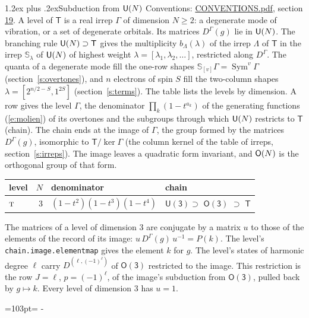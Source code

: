 \documentclass[10pt,a4paper]{article}
\makeatletter
\renewcommand\section{\@startsection{section}{1}{\z@}{-3ex plus -1ex minus -.2ex}%
  {1.2ex plus .2ex}{\normalfont\large\sffamily\bfseries\color{parttitle}}}
\newcommand{\needspace}[1]{\par\penalty-100\begingroup\dimen0=#1\relax\dimen2=\pagegoal
  \advance\dimen2-\pagetotal\ifdim\dimen0>\dimen2\relax\ifdim\dimen2>0pt\vfil\break\fi\fi
  \endgroup}
\numberwithin{equation}{section}
\newcommand{\grp}[1]{\mathsf{#1}}
\newcommand{\irr}[1]{\text{\normalfont\scshape #1}}
\newcommand{\irrJp}[2]{D^{(#1,#2)}}
\newcommand{\repD}[1]{D^{#1}}
\newcommand{\schur}[1]{\mathbb{S}_{#1}}
\newcommand{\shape}[1]{[#1]}
\makeatother
\begin{document}
\section{Subduction from \texorpdfstring{$\grp{U(\mathnormal{N})}$}{U(N)}}\label{s:unitary}
Conventions: \href{../../CONVENTIONS.pdf}{CONVENTIONS.pdf}, section \href{../../CONVENTIONS.pdf\#conv.19}{19}.
\leavevmode\label{n:local.level.dimension}A level of $\grp{T}$ is a real irrep $\Gamma$ of dimension $N \ge 2$: a degenerate mode of vibration, or a set of degenerate orbitals. \label{n:group.unitary}Its matrices $\repD{\Gamma}(g)$ lie in $\grp{U(\mathnormal{N})}$. \label{n:irrep.schur}\label{n:shape.partition}\label{n:local.partition}\label{n:function.multiplicity.unitary}The branching rule $\grp{U(\mathnormal{N})} \supset \grp{T}$ gives the multiplicity $b_\Lambda(\lambda)$ of the irrep $\Lambda$ of $\grp{T}$ in the irrep $\schur{\lambda}$ of $\grp{U(\mathnormal{N})}$ of highest weight $\lambda = \shape{\lambda_1, \lambda_2, \dots}$, restricted along $\repD{\Gamma}$. \label{n:local.partition.power}\label{n:local.electrons}\label{n:local.spin}The quanta of a degenerate mode fill the one-row shapes $\schur{\shape{v}}\Gamma = \operatorname{Sym}^{v}\Gamma$ (section~\ref{s:overtones}), and $n$ electrons of spin $S$ fill the two-column shapes $\lambda = \shape{2^{n/2-S}, 1^{2S}}$ (section~\ref{s:terms}).
The table lists the levels by dimension. \label{n:head.level}\label{n:head.denominator}\label{n:index.overtone.denominator}\label{n:head.chain}A row gives the level $\Gamma$, the denominator $\prod_k (1 - t^{a_k})$ of the generating functions (\ref{e:molien}) of its overtones and the subgroups through which $\grp{U(\mathnormal{N})}$ restricts to $\grp{T}$ (chain). The chain ends at the image of $\Gamma$, the group formed by the matrices $\repD{\Gamma}(g)$, isomorphic to $\grp{T}/\ker\Gamma$ (the column kernel of the table of irreps, section~\ref{s:irreps}). The image leaves a quadratic form invariant, and $\grp{O(\mathnormal{N})}$ is the orthogonal group of that form.
{\small\begin{longtable}{@{}lrll@{}}\toprule
level & $N$ & denominator & chain\\\midrule\endhead
\bottomrule\endfoot\endlastfoot
$\irr{t}$ & 3 & $(1-t^{2})(1-t^{3})(1-t^{4})$ & $\grp{U(3)} \supset$ \href{O3.pdf}{$\grp{O(3)}$} $\supset$ \href{T.pdf}{$\grp{T}$}\\
\bottomrule\end{longtable}}
\leavevmode\label{n:matrix.conjugator}The matrices of a level of dimension 3 are conjugate by a matrix $u$ to those of the elements of the record of its image: $u\,\repD{\Gamma}(g)\,u^{-1} = P(k)$. The level's \texttt{chain.image.elementmap} gives the element $k$ for $g$. \label{n:index.harmonic.degree}The level's states of harmonic degree $\ell$ carry $\irrJp{\ell}{(-1)^{\ell}}$ of \href{O3.pdf}{$\grp{O(3)}$} restricted to the image. This restriction is the row $J = \ell$, $p = (-1)^{\ell}$, of the image's subduction from \href{O3.pdf}{$\grp{O(3)}$}, pulled back by $g \mapsto k$.
Every level of dimension 3 has $u = 1$.
\needspace{103pt}
\end{document}

